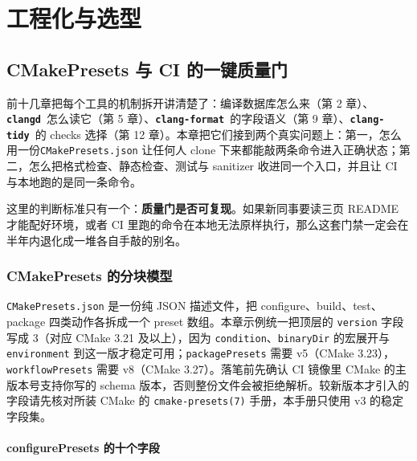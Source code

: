 \documentclass[12pt,a4paper,fontset=fandol]{ctexbook}
\newcommand{\Lib}[1]{\textbf{\texttt{#1}}}
\newcommand{\Tidy}{\Lib{clang-tidy}}
\newcommand{\Fmt}{\Lib{clang-format}}
\newcommand{\CD}{\Lib{clangd}}
\begin{document}
\part{工程化与选型}

\chapter{CMakePresets 与 CI 的一键质量门}\label{ch:ch16}

前十几章把每个工具的机制拆开讲清楚了：编译数据库怎么来（第 2 章）、\CD\ 怎么读它（第 5 章）、\Fmt\ 的字段语义（第 9 章）、\Tidy\ 的 checks 选择（第 12 章）。本章把它们接到两个真实问题上：第一，怎么用一份\texttt{CMakePresets.json} 让任何人 clone 下来都能敲两条命令进入正确状态；第二，怎么把格式检查、静态检查、测试与 sanitizer 收进同一个入口，并且让 CI 与本地跑的是同一条命令。

这里的判断标准只有一个：\textbf{质量门是否可复现}。如果新同事要读三页 README 才能配好环境，或者 CI 里跑的命令在本地无法原样执行，那么这套门禁一定会在半年内退化成一堆各自手敲的别名。

\section{CMakePresets 的分块模型}\label{sec:ch16-s1}

\texttt{CMakePresets.json} 是一份纯 JSON 描述文件，把 configure、build、test、package 四类动作各拆成一个 preset 数组。本章示例统一把顶层的 \texttt{version} 字段写成 3（对应 CMake 3.21 及以上），因为 \texttt{condition}、\texttt{binaryDir} 的宏展开与 \texttt{environment} 到这一版才稳定可用；\texttt{packagePresets} 需要 v5（CMake 3.23），\texttt{workflowPresets} 需要 v8（CMake 3.27）。落笔前先确认 CI 镜像里 CMake 的主版本号支持你写的 schema 版本，否则整份文件会被拒绝解析。较新版本才引入的字段请先核对所装 CMake 的 \texttt{cmake-presets(7)} 手册，本手册只使用 v3 的稳定字段集。

\subsection{configurePresets 的十个字段}\label{sec:ch16-s2}
\end{document}
